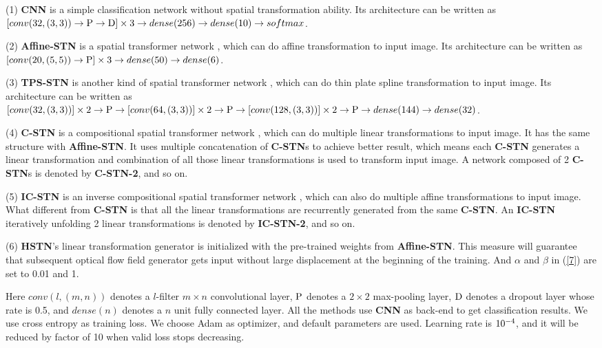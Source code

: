 \documentclass{article}
\begin{document}
(1) \textbf{CNN} is a simple classification network without spatial transformation ability.
Its architecture can be written as
$[conv(32,(3,3)) \to {\rm{P}} \to {\rm{D}}] \times {3} \to dense(256) \to dense(10) \to softmax$.

(2) \textbf{Affine-STN} is a spatial transformer network \cite{jaderberg2015spatial}, which can do affine transformation to input image.
Its architecture can be written as
$[conv(20,(5,5)) \to {\rm{P}}] \times 3 \to dense(50) \to dense(6)$.

(3) \textbf{TPS-STN} is another kind of spatial transformer network \cite{jaderberg2015spatial}, which can do thin plate spline transformation to input image.
Its architecture can be written as
$[conv(32,(3,3))] \times 2 \to {\rm{P}} \to [conv(64,(3,3))] \times 2 \to {\rm{P}} \to [conv(128,(3,3))] \times 2 \to {\rm{P}} \to dense(144) \to dense(32)$.

(4) \textbf{C-STN} is a compositional spatial transformer network \cite{lin2017inverse}, which can do multiple linear transformations to input image.
It has the same structure with \textbf{Affine-STN}.
It uses multiple concatenation of \textbf{C-STN}s to achieve better result, which means each \textbf{C-STN} generates a linear transformation and combination of all those linear transformations is used to transform input image.
A network composed of 2 \textbf{C-STN}s is denoted by \textbf{C-STN-2}, and so on.

(5) \textbf{IC-STN} is an inverse compositional spatial transformer network \cite{lin2017inverse}, which can also do multiple affine transformations to input image.
What different from \textbf{C-STN} is that all the linear transformations are recurrently generated from the same \textbf{C-STN}.
An \textbf{IC-STN} iteratively unfolding 2 linear transformations is denoted by \textbf{IC-STN-2}, and so on.

(6) \textbf{HSTN}'s linear transformation generator is initialized with the pre-trained weights from \textbf{Affine-STN}.
This measure will guarantee that subsequent optical flow field generator gets input without large displacement at the beginning of the training.
And $\alpha$ and $\beta$ in (\ref{7}) are set to 0.01 and 1.

Here $conv(l,(m,n))$ denotes a $l$-filter $m \times n$ convolutional layer,
${\rm{P}}$ denotes a $2 \times 2$ max-pooling layer,
${\rm{D}}$ denotes a dropout layer whose rate is 0.5,
and $dense(n)$ denotes a $n$ unit fully connected layer.
All the methods use \textbf{CNN} as back-end to get classification results.
We use cross entropy as training loss.
We choose Adam \cite{Adam} as optimizer, and default parameters are used.
Learning rate is ${10^{{\rm{ - }}4}}$, and it will be reduced by factor of 10 when valid loss stops decreasing.
\end{document}
